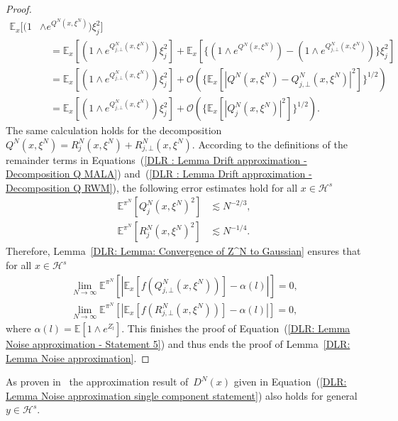 \begin{proof}
  \begin{align*}
   \mathbb{E}_x[(1 & \wedge e^{Q^N(x, \xi^N)})\xi_j^2] \\
   & \quad = \mathbb{E}_x[(1 \wedge e^{Q^N_{j, \bot}(x, \xi^N)})\xi_j^2] + \mathbb{E}_x[\{ (1  \wedge e^{Q^N(x, \xi^N)}) - (1 \wedge e^{Q^N_{j, \bot}(x, \xi^N)}) \}\xi_j^2] \\
   & \quad = \mathbb{E}_x[(1 \wedge e^{Q^N_{j, \bot}(x, \xi^N)})\xi_j^2] + \mathcal{O}( \{ \mathbb{E}_x[|Q^N(x, \xi^N) -  Q^N_{j, \bot}(x, \xi^N) |^2] \}^{1/2} ) \\
   & \quad = \mathbb{E}_x[(1 \wedge e^{Q^N_{j, \bot}(x, \xi^N)})\xi_j^2] + \mathcal{O}( \{ \mathbb{E}_x[|Q^N_j(x, \xi^N) |^2] \}^{1/2} ).
  \end{align*}
  The same calculation holds for the decomposition~$Q^N(x, \xi^N) = R^N_j(x, \xi^N) + R^N_{j, \bot}(x, \xi^N)$. According to the definitions of the remainder terms in Equations~(\ref{DLR : Lemma Drift approximation - Decomposition Q MALA}) and~(\ref{DLR : Lemma Drift approximation - Decomposition Q RWM}), the following error estimates hold for all $x \in \mathcal{H}^s$
  \begin{align*}
    \mathbb{E}^{\pi^N}[Q^N_j(x, \xi^N)^2]  & \lesssim N^{-2/3},\\
    \mathbb{E}^{\pi^N}[R^N_j(x, \xi^N)^2]  & \lesssim N^{-1/4}.
  \end{align*}
  Therefore, Lemma~\ref{DLR: Lemma: Convergence of Z^N to Gaussian} ensures that for all $x \in \mathcal{H}^s$
  \begin{equation*}
    \begin{split}
    \lim_{N \to \infty} \mathbb{E}^{\pi^N} [ | \mathbb{E}_x [f(Q^N_{j, \bot}(x, \xi^N))] - \alpha(l) | ] = 0, \\
    \lim_{N \to \infty} \mathbb{E}^{\pi^N} [ | \mathbb{E}_x [f(R^N_{j, \bot}(x, \xi^N))] - \alpha(l) | ] = 0,
    \end{split}
  \end{equation*}
  where $\alpha (l) = \mathbb{E}[ 1 \wedge e^{Z_l^{\cdot}} ]$. This finishes the proof of Equation~(\ref{DLR: Lemma Noise approximation - Statement 5}) and thus ends the proof of Lemma~\ref{DLR: Lemma Noise approximation}.
\end{proof}

As proven in~\autocite[Corollary 4.9]{Pillai2012} the approximation result of~$D^N(x)$ given in Equation~(\ref{DLR: Lemma Noise approximation single component statement}) also holds for general~$y \in \mathcal{H}^s$.

